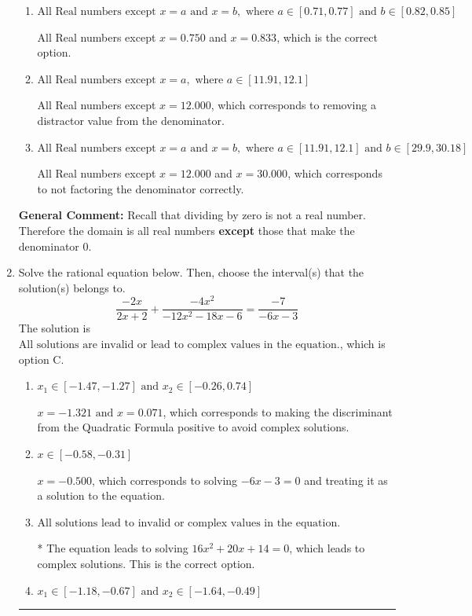 \documentclass{extbook}[14pt]
\newcommand{\litem}[1]{\item #1

\rule{\textwidth}{0.4pt}}
\begin{document}
\begin{enumerate}
{\begin{enumerate}[label=\Alph*.]
This corresponds to thinking the denominator has complex roots or that rational functions have a domain of all Real numbers.
\item \( \text{All Real numbers except } x = a \text{ and } x = b, \text{ where } a \in [0.71, 0.77] \text{ and } b \in [0.82, 0.85] \)

All Real numbers except $x = 0.750$ and $x = 0.833$, which is the correct option.
\item \( \text{All Real numbers except } x = a, \text{ where } a \in [11.91, 12.1] \)

All Real numbers except $x = 12.000$, which corresponds to removing a distractor value from the denominator.
\item \( \text{All Real numbers except } x = a \text{ and } x = b, \text{ where } a \in [11.91, 12.1] \text{ and } b \in [29.9, 30.18] \)

All Real numbers except $x = 12.000$ and $x = 30.000$, which corresponds to not factoring the denominator correctly.
\end{enumerate}

\textbf{General Comment:} Recall that dividing by zero is not a real number. Therefore the domain is all real numbers \textbf{except} those that make the denominator 0.
}
\litem{
Solve the rational equation below. Then, choose the interval(s) that the solution(s) belongs to.
\[ \frac{-2x}{2x + 2} + \frac{-4x^{2}}{-12x^{2} -18 x -6} = \frac{-7}{-6x -3} \]The solution is \( \text{All solutions are invalid or lead to complex values in the equation.} \), which is option C.\begin{enumerate}[label=\Alph*.]
\item \( x_1 \in [-1.47, -1.27] \text{ and } x_2 \in [-0.26,0.74] \)

$x = -1.321 \text{ and } x = 0.071$, which corresponds to making the discriminant from the Quadratic Formula positive to avoid complex solutions.
\item \( x \in [-0.58,-0.31] \)

$x = -0.500$, which corresponds to solving $-6x -3 = 0$ and treating it as a solution to the equation.
\item \( \text{All solutions lead to invalid or complex values in the equation.} \)

* The equation leads to solving $16x^{2} +20 x + 14=0$, which leads to complex solutions. This is the correct option.
\item \( x_1 \in [-1.18, -0.67] \text{ and } x_2 \in [-1.64,-0.49] \)


\end{enumerate}}
\end{enumerate}
\end{document}
